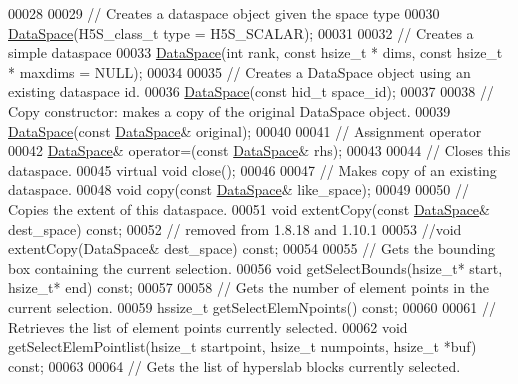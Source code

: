 \begin{DoxyCode}
00028 
00029         \textcolor{comment}{// Creates a dataspace object given the space type}
00030         \hyperlink{class_h5_1_1_data_space}{DataSpace}(H5S\_class\_t type = H5S\_SCALAR);
00031 
00032         \textcolor{comment}{// Creates a simple dataspace}
00033         \hyperlink{class_h5_1_1_data_space}{DataSpace}(\textcolor{keywordtype}{int} rank, \textcolor{keyword}{const} hsize\_t * dims, \textcolor{keyword}{const} hsize\_t * maxdims = NULL);
00034 
00035         \textcolor{comment}{// Creates a DataSpace object using an existing dataspace id.}
00036         \hyperlink{class_h5_1_1_data_space}{DataSpace}(\textcolor{keyword}{const} hid\_t space\_id);
00037 
00038         \textcolor{comment}{// Copy constructor: makes a copy of the original DataSpace object.}
00039         \hyperlink{class_h5_1_1_data_space}{DataSpace}(\textcolor{keyword}{const} \hyperlink{class_h5_1_1_data_space}{DataSpace}& original);
00040 
00041         \textcolor{comment}{// Assignment operator}
00042         \hyperlink{class_h5_1_1_data_space}{DataSpace}& operator=(\textcolor{keyword}{const} \hyperlink{class_h5_1_1_data_space}{DataSpace}& rhs);
00043 
00044         \textcolor{comment}{// Closes this dataspace.}
00045         \textcolor{keyword}{virtual} \textcolor{keywordtype}{void} close();
00046 
00047         \textcolor{comment}{// Makes copy of an existing dataspace.}
00048         \textcolor{keywordtype}{void} copy(\textcolor{keyword}{const} \hyperlink{class_h5_1_1_data_space}{DataSpace}& like\_space);
00049 
00050         \textcolor{comment}{// Copies the extent of this dataspace.}
00051         \textcolor{keywordtype}{void} extentCopy(\textcolor{keyword}{const} \hyperlink{class_h5_1_1_data_space}{DataSpace}& dest\_space) \textcolor{keyword}{const};
00052         \textcolor{comment}{// removed from 1.8.18 and 1.10.1}
00053         \textcolor{comment}{//void extentCopy(DataSpace& dest\_space) const;}
00054 
00055         \textcolor{comment}{// Gets the bounding box containing the current selection.}
00056         \textcolor{keywordtype}{void} getSelectBounds(hsize\_t* start, hsize\_t* end) \textcolor{keyword}{const};
00057 
00058         \textcolor{comment}{// Gets the number of element points in the current selection.}
00059         hssize\_t getSelectElemNpoints() \textcolor{keyword}{const};
00060 
00061         \textcolor{comment}{// Retrieves the list of element points currently selected.}
00062         \textcolor{keywordtype}{void} getSelectElemPointlist(hsize\_t startpoint, hsize\_t numpoints, hsize\_t *buf) \textcolor{keyword}{const};
00063 
00064         \textcolor{comment}{// Gets the list of hyperslab blocks currently selected.}

\end{DoxyCode}
